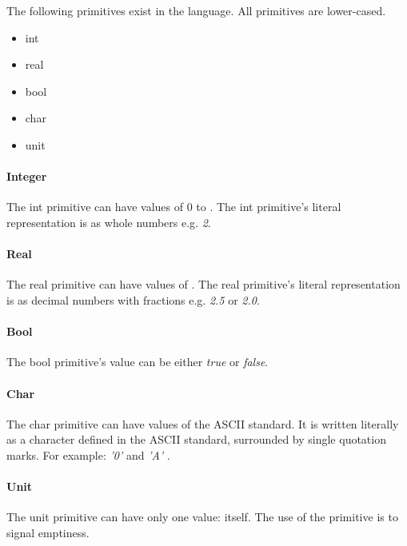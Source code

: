 The following primitives exist in the language. All primitives are lower-cased.

\begin{itemize}
  \item int
  \item real
  \item bool
  \item char
  \item unit
\end{itemize}

\paragraph{Integer}
\label{subsubsec:int}

The int primitive can have values of 0 to . The int primitive's literal representation is as whole numbers e.g. \emph{2}.

\paragraph{Real}
\label{subsubsec:real}

The real primitive can have values of . The real primitive's literal representation is as decimal numbers with fractions e.g. \emph{2.5} or \emph{2.0}.

\paragraph{Bool}
\label{subsubsec:bool}

The bool primitive's value can be either \emph{true} or \emph{false}.

\paragraph{Char}
\label{sec:char}

The char primitive can have values of the ASCII standard. It is written literally as a character defined in the ASCII standard, surrounded by single quotation marks. For example: \emph{ '0' } and \emph{ 'A' }.

\paragraph{Unit}
\label{sec:unit}

The unit primitive can have only one value: itself. The use of the primitive is to signal emptiness.

